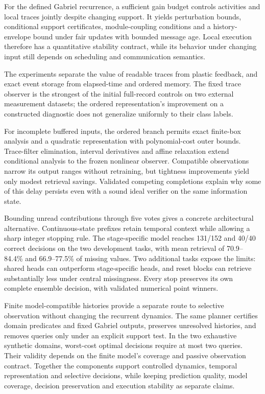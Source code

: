 \documentclass[11pt,a4paper]{article}
\theoremstyle{definition}\newtheorem{definition}[theorem]{Definition}
\begin{document}
For the defined Gabriel recurrence, a sufficient gain budget controls activities and local traces jointly despite changing support. It yields perturbation bounds, conditional support certificates, module-coupling conditions and a history-envelope bound under fair updates with bounded message age. Local execution therefore has a quantitative stability contract, while its behavior under changing input still depends on scheduling and communication semantics.

The experiments separate the value of readable traces from plastic feedback, and exact event storage from elapsed-time and ordered memory. The fixed trace observer is the strongest of the initial full-record controls on two external measurement datasets; the ordered representation's improvement on a constructed diagnostic does not generalize uniformly to their class labels.

For incomplete buffered inputs, the ordered branch permits exact finite-box analysis and a quadratic representation with polynomial-cost outer bounds. Trace-filter elimination, interval derivatives and affine relaxation extend conditional analysis to the frozen nonlinear observer. Compatible observations narrow its output ranges without retraining, but tightness improvements yield only modest retrieval savings. Validated competing completions explain why some of this delay persists even with a sound ideal verifier on the same information state.

Bounding unread contributions through five votes gives a concrete architectural alternative. Continuous-state prefixes retain temporal context while allowing a sharp integer stopping rule. The stage-specific model reaches 131/152 and 40/40 correct decisions on the two development tasks, with mean retrieval of 70.9--84.4\% and 66.9--77.5\% of missing values. Two additional tasks expose the limits: shared heads can outperform stage-specific heads, and reset blocks can retrieve substantially less under central missingness. Every stop preserves its own complete ensemble decision, with validated numerical point winners.

Finite model-compatible histories provide a separate route to selective observation without changing the recurrent dynamics. The same planner certifies domain predicates and fixed Gabriel outputs, preserves unresolved histories, and removes queries only under an explicit support test. In the two exhaustive synthetic domains, worst-cost optimal decisions require at most two queries. Their validity depends on the finite model's coverage and passive observation contract. Together the components support controlled dynamics, temporal representation and selective decisions, while keeping prediction quality, model coverage, decision preservation and execution stability as separate claims.
\end{document}
